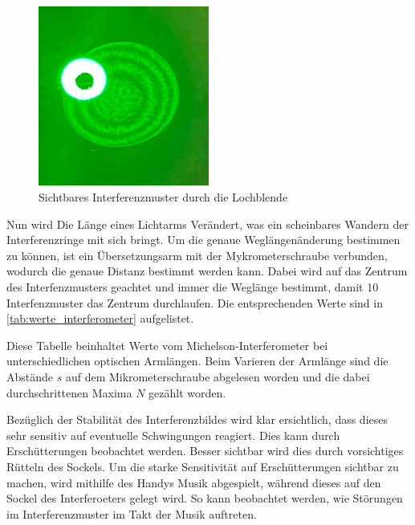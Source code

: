 \documentclass[12pt,english,ngerman]{scrartcl}
\begin{document}
\begin{figure}[H]
	\begin{center}
		\includegraphics[width =0.5\textwidth]{./figures/Blende.JPG}
	\end{center}
	\caption[Sichtbares Interferenzmuster durch die Lochblende] { Sichtbares
		Interferenzmuster durch die Lochblende
	}\label{fig:beugungsbild_lochblende}
\end{figure}

Nun wird Die Länge eines Lichtarms Verändert, was ein scheinbares Wandern der
Interferenzringe mit sich bringt. Um die genaue Weglängenänderung bestimmen zu
können, ist ein Übersetzungsarm mit der Mykrometerschraube verbunden, wodurch
die genaue Distanz bestimmt werden kann. Dabei wird auf das Zentrum des
Interfenzmusters geachtet und immer die Weglänge bestimmt, damit 10
Interfenzmuster das Zentrum durchlaufen. Die entsprechenden Werte sind in
\autoref{tab:werte_interferometer} aufgelistet.

\begin{table}[H]
	\caption{Diese Tabelle beinhaltet Werte vom Michelson-Interferometer bei
  unterschiedlichen optischen Armlängen. Beim Varieren der Armlänge sind die Abstände 
$s$ auf dem Mikrometerschraube abgelesen worden und die dabei durchschrittenen Maxima 
$N$ gezählt worden.}\label{tab:werte_interferometer}
	\centering
	
\end{table}

Bezüglich der Stabilität des Interferenzbildes wird klar ersichtlich, dass
dieses sehr sensitiv auf eventuelle Schwingungen reagiert. Dies kann durch
Erschütterungen beobachtet werden. Besser sichtbar wird dies durch vorsichtiges
Rütteln des Sockels. Um die starke Sensitivität auf Erschütterungen sichtbar zu
machen, wird mithilfe des Handys Musik abgespielt, während dieses auf den
Sockel des Interferoeters gelegt wird. So kann beobachtet werden, wie Störungen
im Interferenzmuster im Takt der Musik auftreten.
\end{document}
